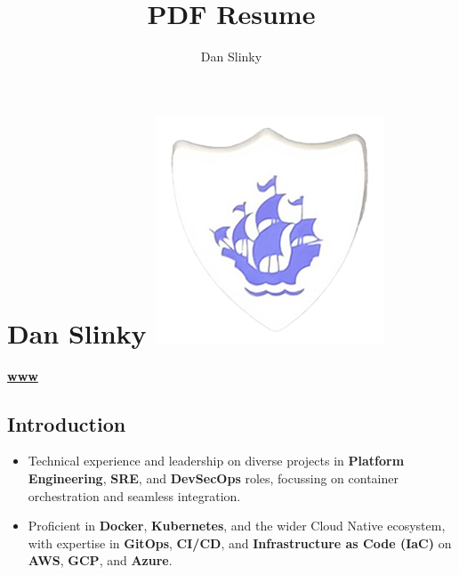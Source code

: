 \documentclass[
]{article}
\author{}
\date{}
\title{PDF Resume}
\author{Dan Slinky}
\date{}
\providecommand{\tightlist}{%
  \setlength{\itemsep}{0pt}\setlength{\parskip}{0pt}}
\begin{document}

\hypertarget{simple-markdown-dan-slinky}{%
\section[\faMarkdown Dan Slinky ]{\texorpdfstring{\faMarkdown Dan Slinky
\protect\includegraphics{../../favicon.png}}{ Dan Slinky }}\label{simple-markdown-dan-slinky}}

\href{https://rtfm.danslinky.co.uk/resumes}{\textbf{www}}
\href{https://linkedin.com/in/danslinky}{\faLinkedin}
\href{https://github.com/danslinky}{\faGithub}
\href{mailto:sysadmin@danslinky.co.uk}{\faEnvelope}

\hypertarget{fontawesome-solid-terminal-introduction}{%
\subsection{\texorpdfstring{\faTerminal
Introduction}{ Introduction}}\label{fontawesome-solid-terminal-introduction}}

\begin{itemize}
\tightlist
\item
  Technical experience and leadership on diverse projects in
  \textbf{Platform Engineering}, \textbf{SRE}, and \textbf{DevSecOps}
  roles, focussing on container orchestration and seamless integration.
\item
  Proficient in \faDocker \textbf{Docker}, \faDharmachakra
  \textbf{Kubernetes}, and the wider Cloud Native ecosystem, with
  expertise in \textbf{GitOps}, \textbf{CI/CD}, and
  \textbf{Infrastructure as Code (IaC)} on \textbf{AWS}, \textbf{GCP},
  and \textbf{Azure}.
\end{itemize}
\end{document}
